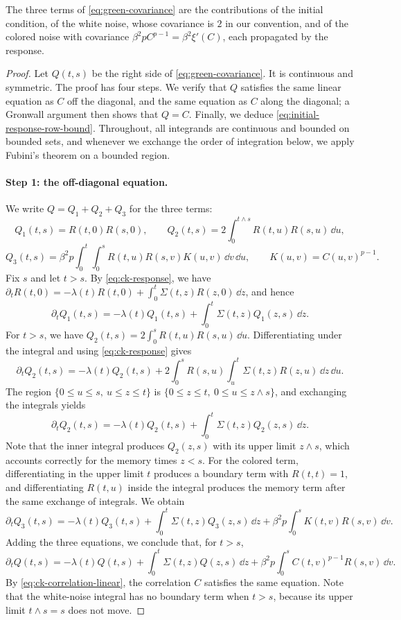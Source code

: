 The three terms of \eqref{eq:green-covariance} are the contributions of the initial condition, of the white noise, whose covariance is $2$ in our convention, and of the colored noise with covariance $\beta^2pC^{p-1}=\beta^2\xi'(C)$, each propagated by the response.

\begin{proof}
Let $Q(t,s)$ be the right side of \eqref{eq:green-covariance}. It is continuous and symmetric. The proof has four steps. We verify that $Q$ satisfies the same linear equation as $C$ off the diagonal, and the same equation as $C$ along the diagonal; a Gronwall argument then shows that $Q=C$. Finally, we deduce \eqref{eq:initial-response-row-bound}. Throughout, all integrands are continuous and bounded on bounded sets, and whenever we exchange the order of integration below, we apply Fubini's theorem on a bounded region.

\paragraph{Step 1: the off-diagonal equation.}
We write $Q=Q_1+Q_2+Q_3$ for the three terms:
\[
 Q_1(t,s)=R(t,0)R(s,0),\qquad
 Q_2(t,s)=2\int_0^{t\wedge s}R(t,u)R(s,u)\,\dd u,
\]
\[
 Q_3(t,s)=\beta^2p\int_0^t\int_0^sR(t,u)R(s,v)K(u,v)\,\dd v\,\dd u,\qquad K(u,v)=C(u,v)^{p-1}.
\]
Fix $s$ and let $t>s$. By \eqref{eq:ck-response}, we have $\partial_tR(t,0)=-\lambda(t)R(t,0)+\int_0^t\Sigma(t,z)R(z,0)\,\dd z$, and hence
\[
 \partial_tQ_1(t,s)=-\lambda(t)Q_1(t,s)+\int_0^t\Sigma(t,z)Q_1(z,s)\,\dd z.
\]
For $t>s$, we have $Q_2(t,s)=2\int_0^sR(t,u)R(s,u)\,\dd u$. Differentiating under the integral and using \eqref{eq:ck-response} gives
\[
 \partial_tQ_2(t,s)=-\lambda(t)Q_2(t,s)+2\int_0^sR(s,u)\int_u^t\Sigma(t,z)R(z,u)\,\dd z\,\dd u.
\]
The region $\{0\le u\le s,\ u\le z\le t\}$ is $\{0\le z\le t,\ 0\le u\le z\wedge s\}$, and exchanging the integrals yields
\[
 \partial_tQ_2(t,s)=-\lambda(t)Q_2(t,s)+\int_0^t\Sigma(t,z)Q_2(z,s)\,\dd z.
\]
Note that the inner integral produces $Q_2(z,s)$ with its upper limit $z\wedge s$, which accounts correctly for the memory times $z<s$. For the colored term, differentiating in the upper limit $t$ produces a boundary term with $R(t,t)=1$, and differentiating $R(t,u)$ inside the integral produces the memory term after the same exchange of integrals. We obtain
\[
 \partial_tQ_3(t,s)=-\lambda(t)Q_3(t,s)+\int_0^t\Sigma(t,z)Q_3(z,s)\,\dd z+\beta^2p\int_0^sK(t,v)R(s,v)\,\dd v.
\]
Adding the three equations, we conclude that, for $t>s$,
\begin{equation}\label{eq:green-off-diagonal}
 \partial_tQ(t,s)=-\lambda(t)Q(t,s)+\int_0^t\Sigma(t,z)Q(z,s)\,\dd z+\beta^2p\int_0^sC(t,v)^{p-1}R(s,v)\,\dd v.
\end{equation}
By \eqref{eq:ck-correlation-linear}, the correlation $C$ satisfies the same equation. Note that the white-noise integral has no boundary term when $t>s$, because its upper limit $t\wedge s=s$ does not move.


\end{proof}
